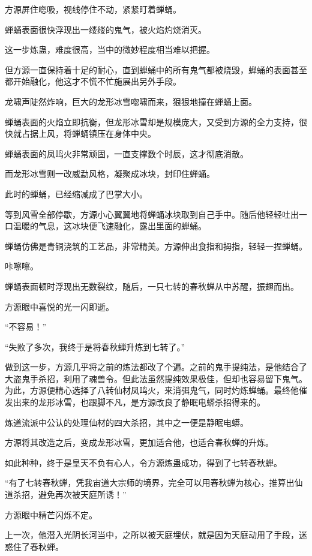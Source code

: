 \begin{this_body}
方源屏住唿吸，视线停住不动，紧紧盯着蝉蛹。

蝉蛹表面很快浮现出一缕缕的鬼气，被火焰灼烧消灭。

这一步炼蛊，难度很高，当中的微妙程度相当难以把握。

但方源一直保持着十足的耐心，直到蝉蛹中的所有鬼气都被烧毁，蝉蛹的表面甚至都开始融化，他这才不慌不忙施展出另外手段。

龙啸声陡然炸响，巨大的龙形冰雪唿啸而来，狠狠地撞在蝉蛹上面。

蝉蛹表面的火焰立即抗衡，但龙形冰雪却是规模庞大，又受到方源的全力支持，很快就占据上风，将蝉蛹镇压在身体中央。

蝉蛹表面的凤鸣火非常顽固，一直支撑数个时辰，这才彻底消散。

而龙形冰雪则一改威勐风格，凝聚成冰块，封印住蝉蛹。

此时的蝉蛹，已经缩减成了巴掌大小。

等到风雪全部停歇，方源小心翼翼地将蝉蛹冰块取到自己手中。随后他轻轻吐出一口温暖的气息，这冰块便飞速融化，露出里面的蝉蛹。

蝉蛹仿佛是青铜浇筑的工艺品，非常精美。方源伸出食指和拇指，轻轻一捏蝉蛹。

咔嚓嚓。

蝉蛹表面顿时浮现出无数裂纹，随后，一只七转的春秋蝉从中苏醒，振翅而出。

方源眼中喜悦的光一闪即逝。

“不容易！”

“失败了多次，我终于是将春秋蝉升炼到七转了。”

做到这一步，方源几乎将之前的炼法都改了个遍。之前的鬼手提纯法，是他结合了大盗鬼手杀招，利用了魂兽令。但此法虽然提纯效果极佳，但却也容易留下鬼气。为此，方源便精心选择了八转仙材凤鸣火，来消弭鬼气，同时灼炼蝉蛹。最终他催发出来的龙形冰雪，也跟脚不凡，是方源改良了静眠电蟒杀招得来的。

炼道流派中公认的处理仙材的四大杀招，其中之一便是静眠电蟒。

方源将其改造之后，变成龙形冰雪，更加适合他，也适合春秋蝉的升炼。

如此种种，终于是皇天不负有心人，令方源炼蛊成功，得到了七转春秋蝉。

“有了七转春秋蝉，凭我宙道大宗师的境界，完全可以用春秋蝉为核心，推算出仙道杀招，避免再次被天庭所诱！”

方源眼中精芒闪烁不定。

上一次，他潜入光阴长河当中，之所以被天庭埋伏，就是因为天庭动用了手段，迷惑住了春秋蝉。


\end{this_body}
